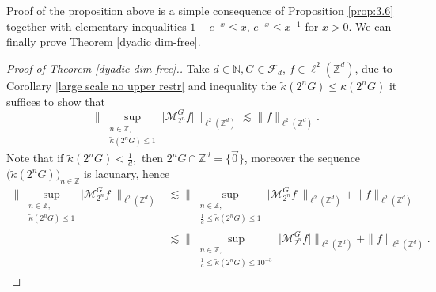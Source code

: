 \documentclass[a4paper,oneside, reqno]{amsart}
\numberwithin{equation}{section}
\theoremstyle{definition}%
\theoremstyle{definition}
\theoremstyle{definition}%
\theoremstyle{definition}
\newcommand{\Z}{\mathbb{Z}}
\newcommand{\N}{\mathbb{N}}
\begin{document}
Proof of the proposition above is a simple consequence of Proposition \ref{prop:3.6} together with elementary inequalities $1-e^{-x} \le x$, $e^{-x} \le x^{-1}$ for $x>0$. We can finally prove
Theorem \ref{dyadic dim-free}. 
\begin{proof}[Proof of Theorem \ref{dyadic dim-free}.]
Take $d \in \N, G \in \mathcal{F}_d$, $f \in \ell^2(\Z^d)$, due to Corollary \ref{large scale no upper restr} and inequality the $\widetilde{\kappa}(2^nG) \le \kappa(2^nG)$ it suffices to show that 
    \begin{equation} \label{eq:small-scale dyad dimfree}
        \Big\| \sup_{\substack{n \in \Z, \\ \widetilde{\kappa}(2^nG) \le 1}} \big| \mathcal{M}_{2^n}^Gf \big| \Big\|_{\ell^2(\Z^d) } \lesssim \|f \|_{\ell^2(\Z^d)}.
    \end{equation}
    Note that if $\widetilde{\kappa}(2^nG)< \frac{1}{d}, $ then $2^n G \cap \Z^d=\{ \overrightarrow{0}\}$, moreover the sequence $\big(\widetilde{\kappa}(2^nG)\big)_{n \in \Z}$ is lacunary, hence 
    \begin{align*}
        \Big\| \sup_{\substack{n \in \Z, \\ \widetilde{\kappa}(2^nG) \le 1}} \big|\mathcal{M}_{2^n}^Gf \big| \Big\|_{\ell^2(\Z^d) } &\lesssim \Big\| \sup_{\substack{n \in \Z, \\ \frac{1}{d} \le \widetilde{\kappa}(2^nG) \le 1}} \big|\mathcal{M}_{2^n}^Gf \big|\Big\|_{\ell^2(\Z^d) } + \|f \|_{\ell^2(\Z^d)} \\
    &\lesssim \Big\| \sup_{\substack{n \in \Z, \\ \frac{1}{d} \le \widetilde{\kappa}(2^nG) \le 10^{-3}}} \big|\mathcal{M}_{2^n}^Gf \big| \Big\|_{\ell^2(\Z^d) } + \|f \|_{\ell^2(\Z^d)}.
    \end{align*}


\end{proof}
\end{document}
